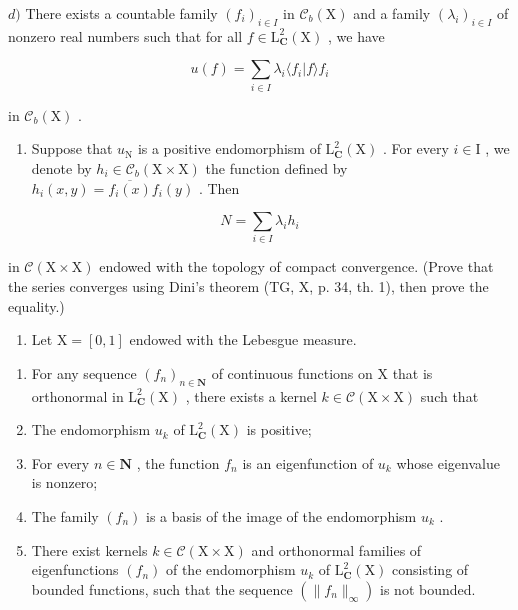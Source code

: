 \(d)\) There exists a countable family \((f_i)_{i\in I}\) in \(\mathcal{C}_b(\mathrm{X})\) and a family \((\lambda_i)_{i\in I}\) of nonzero real numbers such that for all \(f\in \mathrm{L}_{\mathbf{C}}^2 (\mathrm{X})\) , we have

\[
u (f) = \sum_ {i \in I} \lambda_ {i} \langle f _ {i} | f \rangle f _ {i}
\]

in \(\mathcal{C}_b(\mathrm{X})\) .

\begin{enumerate}
\def\labelenumi{\alph{enumi})}
\setcounter{enumi}{4}
\tightlist
\item
  Suppose that \(u_{\mathrm{N}}\) is a positive endomorphism of \(\mathrm{L}_{\mathbf{C}}^{2}(\mathrm{X})\) . For every \(i \in \mathrm{I}\) , we denote by \(h_i \in \mathcal{C}_b(\mathrm{X} \times \mathrm{X})\) the function defined by \(h_i(x,y) = \overline{f_i(x)} f_i(y)\) . Then
\end{enumerate}

\[
N = \sum_ {i \in I} \lambda_ {i} h _ {i}
\]

in \(\mathcal{C}(\mathrm{X}\times\mathrm{X})\) endowed with the topology of compact convergence. (Prove that the series converges using Dini's theorem (TG, X, p. 34, th. 1), then prove the equality.)

\begin{enumerate}
\def\labelenumi{\arabic{enumi})}
\setcounter{enumi}{15}
\tightlist
\item
  Let \(\mathrm{X} = [0,1]\) endowed with the Lebesgue measure.
\end{enumerate}

\begin{enumerate}
\def\labelenumi{\alph{enumi})}
\item
  For any sequence \((f_n)_{n\in \mathbf{N}}\) of continuous functions on X that is orthonormal in \(\mathrm{L}_{\mathbf{C}}^2 (\mathrm{X})\) , there exists a kernel \(k\in \mathcal{C}(\mathrm{X}\times \mathrm{X})\) such that
\item
  The endomorphism \(u_{k}\) of \(\mathrm{L}_{\mathbf{C}}^{2}(\mathrm{X})\) is positive;
\item
  For every \(n \in \mathbf{N}\) , the function \(f_n\) is an eigenfunction of \(u_k\) whose eigenvalue is nonzero;
\item
  The family \((f_n)\) is a basis of the image of the endomorphism \(u_k\) .
\item
  There exist kernels \(k \in \mathcal{C}(\mathrm{X} \times \mathrm{X})\) and orthonormal families of eigenfunctions \((f_n)\) of the endomorphism \(u_k\) of \(\mathrm{L}_{\mathbf{C}}^2(\mathrm{X})\) consisting of bounded functions, such that the sequence \((\|f_n\|_\infty)\) is not bounded.
\end{enumerate}

